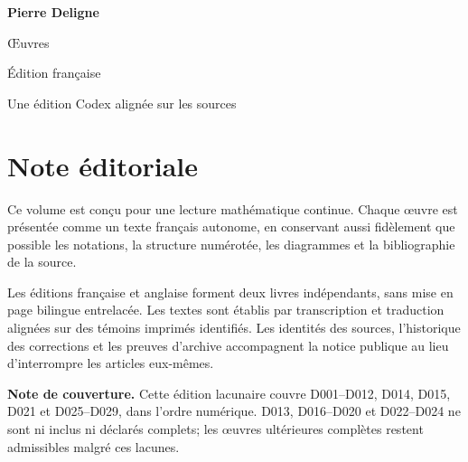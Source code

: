 \documentclass[11pt,a4paper]{article}
\begin{document}
\begin{titlepage}
  \pagecolor{DeligneBlue}
  \color{white}
  \vspace*{34mm}
  {\fontsize{30}{36}\selectfont\bfseries Pierre Deligne\par}
  \vspace{7mm}
  {\fontsize{18}{23}\selectfont Œuvres\par}
  \vspace{4mm}
  {\large Édition française\par}
  \vfill
  {\normalsize Une édition Codex alignée sur les sources\par}
\end{titlepage}
\setcounter{page}{2}
\nopagecolor
\color{DeligneInk}
\section*{Note éditoriale}
Ce volume est conçu pour une lecture mathématique continue. Chaque œuvre est présentée comme un texte français autonome, en conservant aussi fidèlement que possible les notations, la structure numérotée, les diagrammes et la bibliographie de la source.

Les éditions française et anglaise forment deux livres indépendants, sans mise en page bilingue entrelacée. Les textes sont établis par transcription et traduction alignées sur des témoins imprimés identifiés. Les identités des sources, l'historique des corrections et les preuves d'archive accompagnent la notice publique au lieu d'interrompre les articles eux-mêmes.

\textbf{Note de couverture.} Cette édition lacunaire couvre D001--D012, D014, D015, D021 et D025--D029, dans l'ordre numérique. D013, D016--D020 et D022--D024 ne sont ni inclus ni déclarés complets; les œuvres ultérieures complètes restent admissibles malgré ces lacunes.
\end{document}

